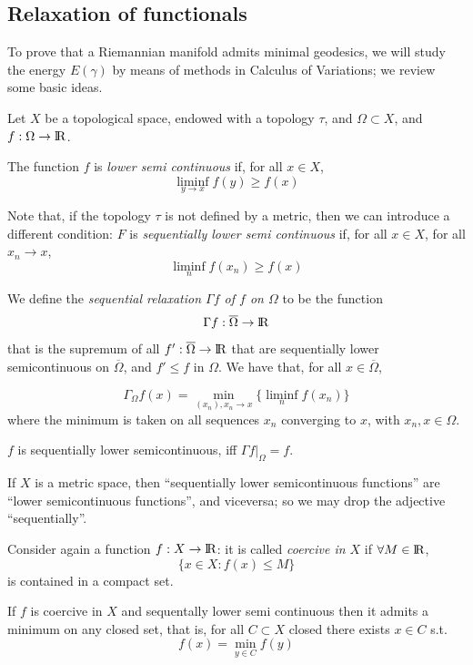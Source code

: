 \documentclass[twoside,a4paper,english]{article}
\begin{document}
\subsection{Relaxation of functionals}
\label{sec:relaxation}
To prove that
a Riemannian manifold admits minimal geodesics, we 
will study the energy $E(\gamma)$ by means of methods
in Calculus of Variations; we review some basic ideas.


\begingroup
\def\F{{\Omega}}
Let $X$ be a topological space, endowed with a topology $\tau$,
and  $\F\subset X$, and $f:\F\to\real$.

The function $f$ is \emph{lower semi continuous} if, for all $x\in X$,
$$ \liminf_{y\to x} f(y) \ge f(x)  $$


Note that, if the topology $\tau$ is not defined by a metric, 
then we can introduce a different condition:
$F$ is \emph{sequentially lower semi continuous} if, for all $x\in X$,
for all $x_n\to x$,
$$ \liminf_n f(x_n) \ge f(x)  $$


We define the \emph{sequential relaxation $\Gamma f$ of $f$ on $\F$}
  to be the function
\[\Gamma f:\overbar \F\to\real\]
that is  the supremum of all $f':\overbar \F\to\real$  
that are sequentially lower semicontinuous on 
$\overbar \F$,
and $f'\le f$ in $\F$. We have that, for all $x\in \overbar \F$,

$$\Gamma_\F f (x)= \min_{(x_n), x_n\to x} \{ \liminf_n f(x_n) \} $$
where the minimum is taken on all sequences $x_n$ converging to $x$,
with $x_n,x\in \F$.

$f$ is sequentially lower semicontinuous,  iff $\Gamma f|_{\F}=f$.

If $X$ is a metric space, then ``sequentially lower semicontinuous 
functions'' are ``lower semicontinuous 
functions'', and viceversa; so we may drop the adjective ``sequentially''.

\endgroup

\medskip

Consider again a function $f:X\to {\protect\mathrm{l\hskip-0.15em R}}$: 
it is called \emph{coercive in $X$} if $\forall M\in{\protect\mathrm{l\hskip-0.15em R}}$,
$$ \{ x\in X : f(x) \le M \}$$ 
is contained in a  compact set.

\begin{Proposition}\label{standard CV}
  If $f$ is coercive in $X$ and sequentally lower semi continuous
  then it admits a minimum on any closed set, that is, 
  for all $C\subset X$ closed there exists $x\in C$ s.t.
  $$f(x)=\min_{y\in C} f(y)$$
\end{Proposition}
\end{document}
